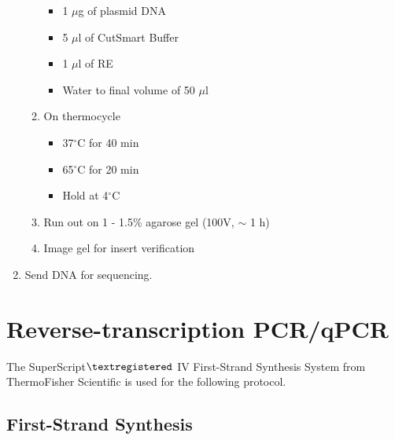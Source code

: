 \begin{enumerate}
\begin{enumerate}
\begin{itemize}
    \item 1 $\mu$g of plasmid DNA
    \item 5 $\mu$l of CutSmart Buffer
    \item 1 $\mu$l of RE
    \item Water to final volume of 50 $\mu$l
    \end{itemize}
  \item On thermocycle
    \begin{itemize}
    \item 37$^{\circ}$C for 40 min
    \item 65$^{\circ}$C for 20 min
    \item Hold at 4$^{\circ}$C
    \end{itemize}
  \item Run out on 1 - 1.5\% agarose gel (100V, $\sim$ 1 h)
  \item Image gel for insert verification
  \end{enumerate}
\item Send DNA for sequencing.
\end{enumerate}
  
\pagebreak

\section{Reverse-transcription PCR/qPCR}

\noindent The SuperScript$\textregistered$ IV First-Strand Synthesis System from ThermoFisher Scientific is used for the following protocol.

\subsection{First-Strand Synthesis}

